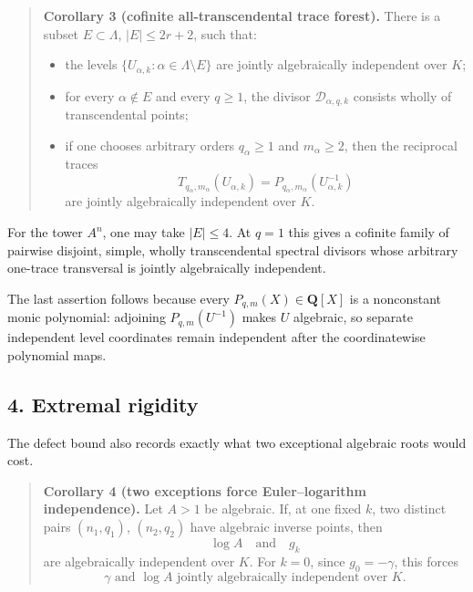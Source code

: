 \documentclass[11pt]{article}
\theoremstyle{keio}
\theoremstyle{definition}
\theoremstyle{remark}
\providecommand{\tightlist}{\setlength{\itemsep}{0pt}\setlength{\parskip}{0pt}}
\begin{document}
\begin{quote}
\textbf{Corollary 3 (cofinite all-transcendental trace forest).} There is a
subset \(E\subset\Lambda\), \(|E|\leq2r+2\), such that:

\begin{itemize}
\tightlist
\item
  the levels \(\{U_{\alpha,k}:\alpha\in\Lambda\setminus E\}\) are jointly
  algebraically independent over \(K\);
\item
  for every \(\alpha\notin E\) and every \(q\geq1\), the divisor
  \(\mathcal D_{\alpha,q,k}\) consists wholly of transcendental points;
\item
  if one chooses arbitrary orders \(q_\alpha\geq1\) and
  \(m_\alpha\geq2\), then the reciprocal traces
  \[
   T_{q_\alpha,m_\alpha}(U_{\alpha,k})
   =P_{q_\alpha,m_\alpha}(U_{\alpha,k}^{-1})
  \]
  are jointly algebraically independent over \(K\).
\end{itemize}
\end{quote}

For the tower \(A^n\), one may take \(|E|\leq4\). At \(q=1\) this gives a
cofinite family of pairwise disjoint, simple, wholly transcendental spectral
divisors whose arbitrary one-trace transversal is jointly algebraically
independent.

The last assertion follows because every
\(P_{q,m}(X)\in\mathbf Q[X]\) is a nonconstant monic polynomial: adjoining
\(P_{q,m}(U^{-1})\) makes \(U\) algebraic, so separate independent level
coordinates remain independent after the coordinatewise polynomial maps.

\subsection{4. Extremal rigidity}

The defect bound also records exactly what two exceptional algebraic roots
would cost.

\begin{quote}
\textbf{Corollary 4 (two exceptions force Euler--logarithm independence).}
Let \(A>1\) be algebraic. If, at one fixed \(k\), two distinct pairs
\((n_1,q_1)\), \((n_2,q_2)\) have algebraic inverse points, then
\[
 \log A\quad\text{and}\quad g_k
\]
are algebraically independent over \(K\). For \(k=0\), since
\(g_0=-\gamma\), this forces
\[
 \boxed{\ \gamma\text{ and }\log A
 \text{ jointly algebraically independent over }K.\ }
\]
\end{quote}
\end{document}
